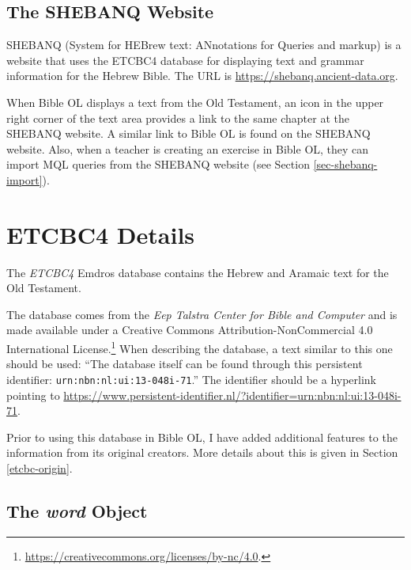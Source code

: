 \documentclass[11pt,oneside,a4paper]{memoir}
\begin{document}
\section{The SHEBANQ Website}\label{sec-shebanq}

SHEBANQ (System for HEBrew text: ANnotations for Queries and markup) is a website that uses the
ETCBC4 database for displaying text and grammar information for the Hebrew Bible. The URL is
\url{https://shebanq.ancient-data.org}.

When Bible OL displays a text from the Old Testament, an icon in the upper right corner of the text
area provides a link to the same chapter at the SHEBANQ website. A similar link to Bible OL is found
on the SHEBANQ website. Also, when a teacher is creating an exercise in Bible OL, they can import
MQL queries from the SHEBANQ website (see Section \ref{sec-shebanq-import}).


\appendix
\chapter{ETCBC4 Details}\label{app-etcbc}

The \emph{ETCBC4} Emdros database contains the Hebrew and Aramaic text for the Old
Testament.

The database comes from the \emph{Eep Talstra Center for Bible and Computer}%
and is made available under a Creative Commons Attribution-NonCommercial 4.0 International
License.\footnote{\url{https://creativecommons.org/licenses/by-nc/4.0}.} When
describing the database, a text similar to this one should be used: ``The database itself can be
found through this persistent identifier: \texttt{urn:nbn:nl:ui:13-048i-71}.'' The identifier should
be a hyperlink pointing to
\url{https://www.persistent-identifier.nl/?identifier=urn:nbn:nl:ui:13-048i-71}.

Prior to using this database in Bible OL, I have added additional features to the information from
its original creators. More details about this is given in Section \ref{etcbc-origin}.

\section{The \emph{word} Object}
\end{document}
